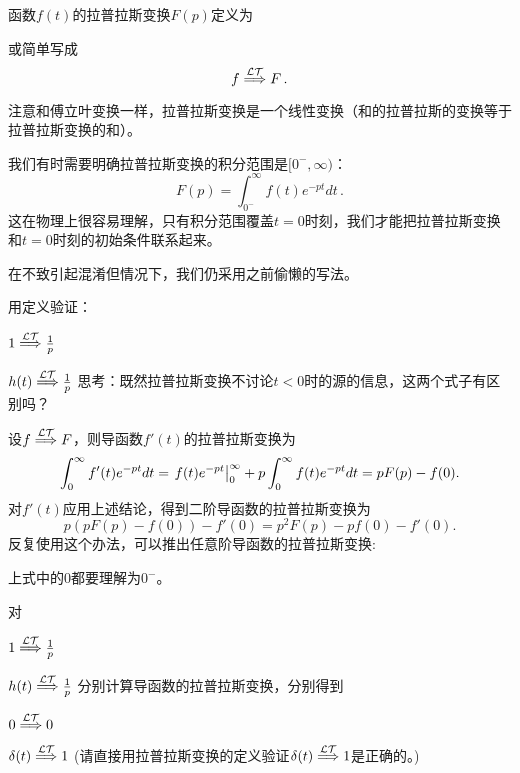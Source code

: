 \documentclass[CJK]{beamer}
\begin{document}
\begin{frame}
\bch
函数$f(t)$的拉普拉斯变换$F(p)$定义为

  或简单写成
  {\blue  $$ f \stackrel{\mathcal{LT}}{\Longrightarrow} F\,. $$}

  注意和傅立叶变换一样，拉普拉斯变换是一个线性变换（和的拉普拉斯的变换等于拉普拉斯变换的和）。


\ech
\end{frame}


\begin{frame}
  \bch
  我们有时需要明确拉普拉斯变换的积分范围是$[0^-,\infty)$：
    {\blue $$F(p) = \int_{0^-}^\infty f(t) e^{-pt} dt\,.$$}
    这在物理上很容易理解，只有积分范围覆盖$t=0$时刻，我们才能把拉普拉斯变换和$t=0$时刻的初始条件联系起来。


    \skiplines
    
  在不致引起混淆但情况下，我们仍采用之前偷懒的写法。

  \ech
\end{frame}

\begin{frame}
  \bch
  
  用定义验证：
  \bitem
\item{\blue $1 \stackrel{\mathcal{LT}}{\Longrightarrow} \frac{1}{p} $}
\item{\blue $h(t) \stackrel{\mathcal{LT}}{\Longrightarrow} \frac{1}{p} $}  
  \eitem
  思考：既然拉普拉斯变换不讨论$t<0$时的源的信息，这两个式子有区别吗？
  \ech
\end{frame}

\begin{frame}
\bch
设$f \stackrel{\mathcal{LT}}{\Longrightarrow} F$，则导函数$f'(t)$的拉普拉斯变换为
$$ \int_0^\infty f'(t) e^{-pt} dt =\left.f(t)e^{-pt}\right\vert_0^\infty + p \int_0^\infty f(t)e^{-pt} dt = pF(p) - f(0). $$
对$f'(t)$应用上述结论，得到二阶导函数的拉普拉斯变换为
$$ p(pF(p) - f(0)) - f'(0) = p^2F(p) - pf(0) - f'(0).$$
反复使用这个办法，可以推出任意阶导函数的拉普拉斯变换:

{\blue 上式中的$0$都要理解为$0^-$。}
\ech
\end{frame}

\begin{frame}
  \bch
  对
  \bitem
\item{\blue $1 \stackrel{\mathcal{LT}}{\Longrightarrow} \frac{1}{p} $}
\item{\blue $h(t) \stackrel{\mathcal{LT}}{\Longrightarrow} \frac{1}{p} $}  
  \eitem
  分别计算导函数的拉普拉斯变换，分别得到
  \bitem
\item{\blue $0 \stackrel{\mathcal{LT}}{\Longrightarrow} 0 $}
\item{\blue $\delta(t) \stackrel{\mathcal{LT}}{\Longrightarrow} 1 $}  
  \eitem
  (请直接用拉普拉斯变换的定义验证$\delta(t)\stackrel{\mathcal{LT}}{\Longrightarrow} 1$是正确的。)

  \ech
\end{frame}
\end{document}

